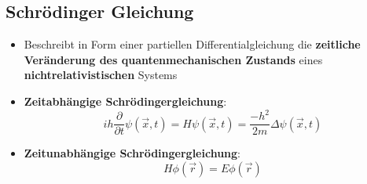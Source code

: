 \subsection{Schrödinger Gleichung}
\label{quant:sub:schroedinger_gleichung}

\begin{itemize}
	\item Beschreibt in Form einer partiellen Differentialgleichung die \textbf{zeitliche Veränderung des quantenmechanischen Zustands} eines \textbf{nichtrelativistischen} Systems
	\item \textbf{Zeitabhängige Schrödingergleichung}:
	$$
		ih\frac{\partial}{\partial t}\psi(\vec{x},t) = H\psi(\vec{x}, t) = \frac{-h^2}{2m}\Delta\psi(\vec{x}, t)
	$$
	\item \textbf{Zeitunabhängige Schrödingergleichung}:
	$$
		H\phi(\vec{r}) = E\phi(\vec{r})
	$$
\end{itemize}
